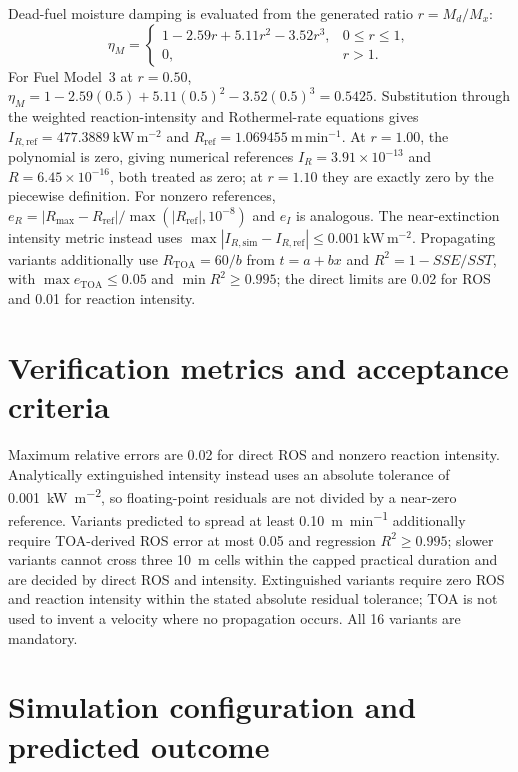 Dead-fuel moisture damping is evaluated from the generated ratio
\(r=M_d/M_x\):
\[
 \eta_M=\begin{cases}
 1-2.59r+5.11r^2-3.52r^3,&0\leq r\leq1,\\
 0,&r>1.
 \end{cases}
\]
For Fuel Model~3 at \(r=0.50\),
\(\eta_M=1-2.59(0.5)+5.11(0.5)^2-3.52(0.5)^3=0.5425\).
Substitution through the weighted reaction-intensity and Rothermel-rate
equations gives
\(I_{R,\mathrm{ref}}=477.3889~\mathrm{kW\,m^{-2}}\) and
\(R_{\mathrm{ref}}=1.069455~\mathrm{m\,min^{-1}}\).
At \(r=1.00\), the polynomial is zero, giving numerical references
\(I_R=3.91\times10^{-13}\) and
\(R=6.45\times10^{-16}\), both treated as zero; at \(r=1.10\) they are
exactly zero by the piecewise definition.
For nonzero references,
\(e_R=|R_{\max}-R_{\mathrm{ref}}|/
\max(|R_{\mathrm{ref}}|,10^{-8})\) and \(e_I\) is analogous.
The near-extinction intensity metric instead uses
\(\max|I_{R,\mathrm{sim}}-I_{R,\mathrm{ref}}|
\leq0.001~\mathrm{kW\,m^{-2}}\).  Propagating variants additionally use
\(R_{\mathrm{TOA}}=60/b\) from \(t=a+bx\) and
\(R^2=1-SSE/SST\), with \(\max e_{\mathrm{TOA}}\leq0.05\) and
\(\min R^2\geq0.995\); the direct limits are 0.02 for ROS and 0.01 for
reaction intensity.

\section{Verification metrics and acceptance criteria}
Maximum relative errors are 0.02 for direct ROS and nonzero reaction intensity. Analytically extinguished intensity instead uses an absolute tolerance of \SI{0.001}{kW.m^{-2}}, so floating-point residuals are not divided by a near-zero reference.  Variants predicted to spread at least \SI{0.10}{m.min^{-1}} additionally require TOA-derived ROS error at most 0.05 and regression $R^2\ge0.995$; slower variants cannot cross three \SI{10}{m} cells within the capped practical duration and are decided by direct ROS and intensity.  Extinguished variants require zero ROS and reaction intensity within the stated absolute residual tolerance; TOA is not used to invent a velocity where no propagation occurs.  All 16 variants are mandatory.

\section{Simulation configuration and predicted outcome}


